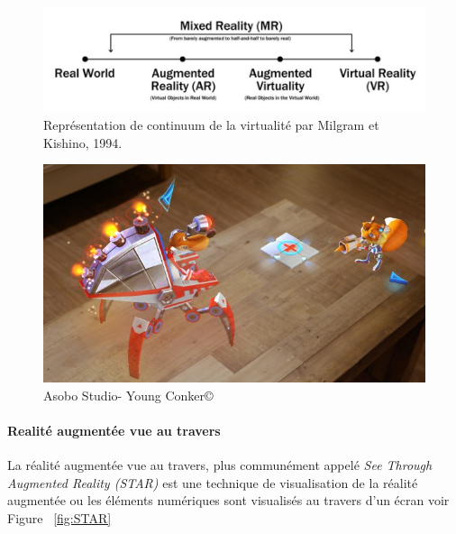 \begin{figure}[h]
\centering
\includegraphics[scale=0.7]{images/RealitySpectrum}
\caption{Représentation de continuum de la virtualité par Milgram et Kishino, 1994.}
\label{fig:realityspectrum}
\end{figure}

\begin{figure}
\centering
\includegraphics[scale=0.4]{images/youngconker}
\caption{Asobo Studio\texttrademark - Young Conker\copyright}
\label{fig:youngconker}
\end{figure}

\paragraph{Realité augmentée vue au travers}
La réalité augmentée vue au travers, plus communément appelé \emph{See Through Augmented Reality (STAR)} est une technique de visualisation de la réalité augmentée ou les éléments numériques sont visualisés au travers d'un écran voir Figure ~\ref{fig:STAR}

